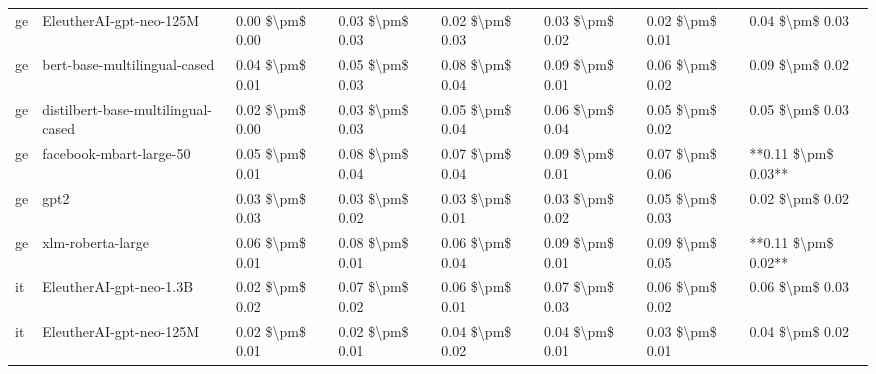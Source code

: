 \begin{tabular}{llllllll}
      ge &            EleutherAI-gpt-neo-125M & 0.00 \$\textbackslash pm\$ 0.00 &           0.03 \$\textbackslash pm\$ 0.03 &       0.02 \$\textbackslash pm\$ 0.03 &        0.03 \$\textbackslash pm\$ 0.02 &                         0.02 \$\textbackslash pm\$ 0.01 &     0.04 \$\textbackslash pm\$ 0.03 \\
      ge &       bert-base-multilingual-cased & 0.04 \$\textbackslash pm\$ 0.01 &           0.05 \$\textbackslash pm\$ 0.03 &       0.08 \$\textbackslash pm\$ 0.04 &        0.09 \$\textbackslash pm\$ 0.01 &                         0.06 \$\textbackslash pm\$ 0.02 &     0.09 \$\textbackslash pm\$ 0.02 \\
      ge & distilbert-base-multilingual-cased & 0.02 \$\textbackslash pm\$ 0.00 &           0.03 \$\textbackslash pm\$ 0.03 &       0.05 \$\textbackslash pm\$ 0.04 &        0.06 \$\textbackslash pm\$ 0.04 &                         0.05 \$\textbackslash pm\$ 0.02 &     0.05 \$\textbackslash pm\$ 0.03 \\
      ge &            facebook-mbart-large-50 & 0.05 \$\textbackslash pm\$ 0.01 &           0.08 \$\textbackslash pm\$ 0.04 &       0.07 \$\textbackslash pm\$ 0.04 &        0.09 \$\textbackslash pm\$ 0.01 &                         0.07 \$\textbackslash pm\$ 0.06 & **0.11 \$\textbackslash pm\$ 0.03** \\
      ge &                               gpt2 & 0.03 \$\textbackslash pm\$ 0.03 &           0.03 \$\textbackslash pm\$ 0.02 &       0.03 \$\textbackslash pm\$ 0.01 &        0.03 \$\textbackslash pm\$ 0.02 &                         0.05 \$\textbackslash pm\$ 0.03 &     0.02 \$\textbackslash pm\$ 0.02 \\
      ge &                  xlm-roberta-large & 0.06 \$\textbackslash pm\$ 0.01 &           0.08 \$\textbackslash pm\$ 0.01 &       0.06 \$\textbackslash pm\$ 0.04 &        0.09 \$\textbackslash pm\$ 0.01 &                         0.09 \$\textbackslash pm\$ 0.05 & **0.11 \$\textbackslash pm\$ 0.02** \\
      it &            EleutherAI-gpt-neo-1.3B & 0.02 \$\textbackslash pm\$ 0.02 &           0.07 \$\textbackslash pm\$ 0.02 &       0.06 \$\textbackslash pm\$ 0.01 &        0.07 \$\textbackslash pm\$ 0.03 &                         0.06 \$\textbackslash pm\$ 0.02 &     0.06 \$\textbackslash pm\$ 0.03 \\
      it &            EleutherAI-gpt-neo-125M & 0.02 \$\textbackslash pm\$ 0.01 &           0.02 \$\textbackslash pm\$ 0.01 &       0.04 \$\textbackslash pm\$ 0.02 &        0.04 \$\textbackslash pm\$ 0.01 &                         0.03 \$\textbackslash pm\$ 0.01 &     0.04 \$\textbackslash pm\$ 0.02 \\

\end{tabular}

